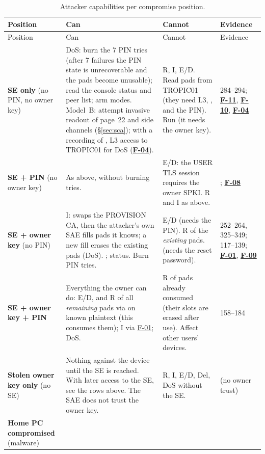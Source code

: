 \documentclass[11pt,a4paper]{article}
\newcommand{\fid}[1]{\textbf{#1}}
\begin{document}
\begin{small}
\begin{longtable}{L{2.7cm}L{5.1cm}L{4.4cm}L{2.6cm}}
\caption{Attacker capabilities per compromise position.}\label{tab:matrix}\\
\toprule Position & Can & Cannot & Evidence\\ \midrule\endfirsthead
\toprule Position & Can & Cannot & Evidence\\ \midrule\endhead
\textbf{SE only} (no PIN, no owner key) &
DoS: burn the 7 PIN tries (after 7 failures the PIN state is unrecoverable and the pads become unusable); read the console status and peer list; arm modes. Model~B: attempt invasive readout of page~22 and side channels (\S\ref{sec:sca}); with a recording of , L3 access to TROPIC01 for DoS (\hyperref[f:F-04]{\fid{F-04}}). &
R, I, E/D. Read pads from TROPIC01 (they need L3, , and the PIN). Run  (it needs the owner key). &
 284--294; \hyperref[f:F-11]{\fid{F-11}}, \hyperref[f:F-10]{\fid{F-10}}, \hyperref[f:F-04]{\fid{F-04}}\\
\textbf{SE + PIN} (no owner key) &
As above, without burning tries. &
E/D: the USER TLS session requires the owner SPKI. R and I as above. &
; \hyperref[f:F-08]{\fid{F-08}}\\
\textbf{SE + owner key} (no PIN) &
I:  swaps the PROVISION CA, then the attacker's own SAE fills pads it knows; a new fill erases the existing pads (DoS). ;  status. Burn PIN tries. &
E/D (needs the PIN). R of the \emph{existing} pads.  (needs the reset password). &
 252--264, 325--349;  117--139; \hyperref[f:F-01]{\fid{F-01}}, \hyperref[f:F-09]{\fid{F-09}}\\
\textbf{SE + owner key + PIN} &
Everything the owner can do: E/D, and R of all \emph{remaining} pads via  on known plaintext (this consumes them); I via \hyperref[f:F-01]{F-01}; DoS. &
R of pads already consumed (their slots are erased after use). Affect other users' devices. &
 158--184\\
\textbf{Stolen owner key only} (no SE) &
Nothing against the device until the SE is reached. With later access to the SE, see the rows above. The SAE does not trust the owner key. &
R, I, E/D, Del, DoS without the SE. &
 (no owner trust)\\
\textbf{Home PC compromised} (malware) &

\end{longtable}
\end{small}
\end{document}
